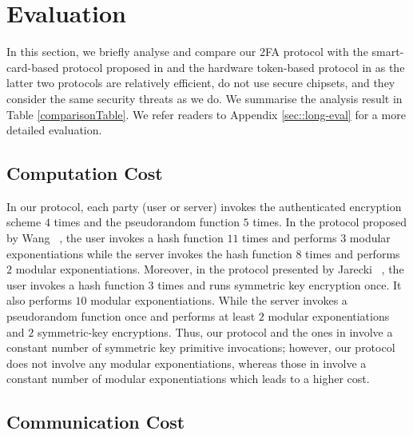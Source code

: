 
\section{Evaluation}\label{sec::eval}

In this section, we briefly analyse and compare our 2FA protocol with the smart-card-based protocol proposed in  \cite{WangW18} and the hardware token-based protocol in \cite{JareckiJKSS21} as the latter two protocols are relatively efficient, do not use secure chipsets, and they consider the same security threats as we do. We summarise the analysis result in Table \ref{comparisonTable}. We refer readers to Appendix \ref{sec::long-eval} for a more detailed evaluation. 







\subsection{Computation Cost}

In our protocol, each party (user or server) invokes the authenticated encryption scheme $4$ times and the pseudorandom function $5$ times. In the protocol proposed by Wang \etal~\cite{WangW18}, the user invokes a hash function $11$ times and performs $3$ modular exponentiations while the server invokes the hash function $8$ times and performs $2$ modular exponentiations. Moreover, in the protocol presented by Jarecki \etal~\cite{JareckiJKSS21}, the user invokes a hash function $3$ times and runs symmetric key encryption once. It also performs $10$ modular exponentiations. While the server invokes a pseudorandom function once and performs at least $2$ modular exponentiations and $2$ symmetric-key encryptions. Thus,  our protocol and the ones in \cite{WangW18,JareckiJKSS21} involve a constant number of symmetric key primitive invocations; however, our protocol does not involve any modular exponentiations, whereas those in  \cite{WangW18,JareckiJKSS21} involve a constant number of modular exponentiations which leads to a higher cost. 

\subsection{Communication Cost}

